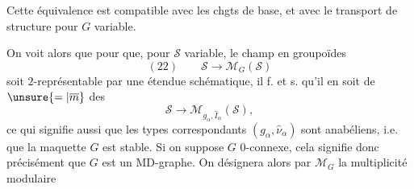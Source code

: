 Cette équivalence est compatible avec les chgts de base, et avec le transport de structure pour $G$ variable.

On voit alors que pour que, pour $\mathcal S$ variable, le champ en groupoïdes
\[
(22)\qquad\mathcal S\longrightarrow\mathcal M_G(\mathcal S)
\]
soit $2$-représentable par une étendue schématique, il f. et s. qu'il en soit de $\unsure{=|\overline m}$ des
\[
\mathcal S\longrightarrow\mathcal M_{g_\alpha,\widehat I_\alpha}(\mathcal S),
\]
ce qui signifie aussi que les types correspondants $(g_\alpha,\widehat\nu_\alpha)$ sont anabéliens, i.e. que la maquette $G$ est stable. Si on suppose  $G$ $0$-connexe, cela signifie donc précisément que $G$ est un MD-graphe. On désignera alors par $\mathcal M_G$ la multiplicité modulaire
